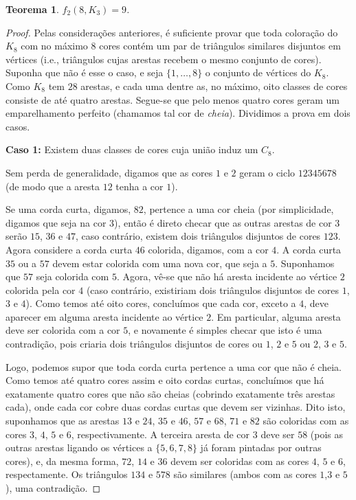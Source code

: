 \documentclass[12pt,a4paper]{book}
\newtheorem{teorema}{Teorema}[chapter]
\begin{document}
\begin{teorema}\label{teo:n8K3}
     $f_2(8,K_3)=9$.
\end{teorema}
\begin{proof}
Pelas considerações anteriores, é suficiente provar que toda coloração do $K_8$ com no máximo $8$ cores  contém um par de triângulos similares disjuntos em vértices (i.e., triângulos cujas arestas recebem o mesmo conjunto de cores).
Suponha que não é esse o caso, e seja $\{1,\dots,8\}$ o conjunto de vértices do $K_8$. 
Como  $K_8$ tem $28$ arestas, e cada uma dentre as, no máximo, oito classes de cores consiste de até quatro  arestas. Segue-se que pelo menos quatro cores geram um emparelhamento perfeito (chamamos tal cor de \emph{cheia}). Dividimos a prova em dois casos.

\medskip
\textbf{Caso 1:} Existem duas classes de cores cuja união induz um $C_8$. 

Sem perda de generalidade, digamos que as cores $1$ e $2$ geram o ciclo $12345678$ (de modo que a aresta $12$ tenha a cor $1$). 

Se uma corda curta, digamos, $82$, pertence a uma cor cheia (por simplicidade, digamos que seja na cor $3$), então é direto checar que as outras arestas de cor $3$ serão $15$, $36$ e $47$, caso contrário, existem dois triângulos disjuntos de cores $123$. 
Agora considere a corda curta $46$ colorida, digamos, com a cor $4$. 
A corda curta $35$ ou a $57$ devem estar colorida com uma nova cor, que seja a $5$. Suponhamos que $57$ seja colorida com $5$. 
Agora, vê-se que não há aresta incidente ao vértice $2$ colorida pela cor $4$ (caso contrário, existiriam dois triângulos disjuntos de cores $1$, $3$ e $4$). 
Como temos até oito cores, concluímos que cada cor, exceto a $4$, deve aparecer em alguma aresta incidente ao vértice $2$. 
Em particular, alguma aresta deve ser colorida com a cor $5$, e novamente é simples checar que isto é uma contradição, pois criaria dois triângulos disjuntos de cores ou $1$, $2$ e $5$ ou $2$, $3$ e $5$.

Logo, podemos supor que toda corda curta pertence a uma cor que não é cheia.
Como temos até quatro cores assim e oito cordas curtas, concluímos que há exatamente quatro cores que não são cheias (cobrindo exatamente três arestas cada), onde cada cor cobre duas cordas curtas que devem ser vizinhas. 
Dito isto, suponhamos que as arestas $13$ e $24$, $35$ e $46$, $57$ e $68$, $71$ e $82$ são coloridas com as cores $3$, $4$, $5$ e $6$, respectivamente.
A terceira aresta de cor $3$ deve ser $58$ (pois as outras arestas ligando os vértices a $\{5,6,7,8\}$ já foram pintadas por outras cores), e, da mesma forma, $72$, $14$ e $36$ devem ser coloridas com as cores $4$, $5$ e $6$, respectamente. Os triângulos $134$ e $578$ são  similares (ambos com as cores $1$,$3$ e $5$), uma contradição.


\end{proof}
\end{document}
